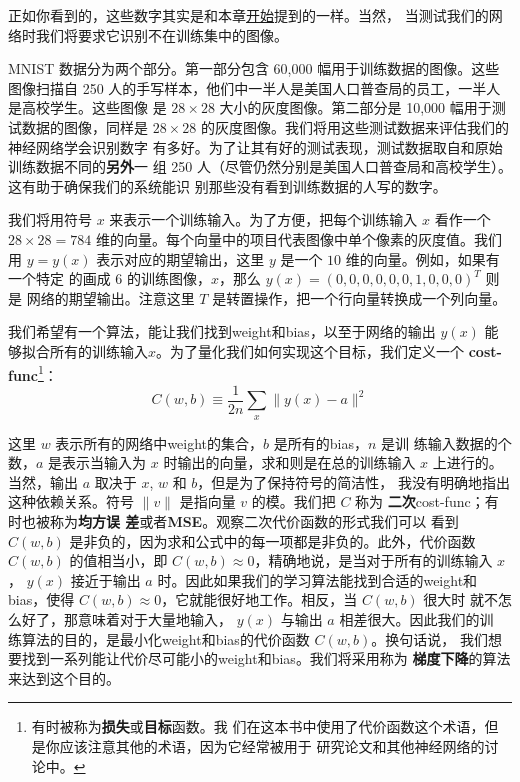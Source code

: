 正如你看到的，这些数字其实是和本章\hyperref[fig:digits]{开始}提到的一样。当然，
当测试我们的网络时我们将要求它识别不在训练集中的图像。

MNIST 数据分为两个部分。第一部分包含 60,000 幅用于训练数据的图像。这些图像扫描自
250 人的手写样本，他们中一半人是美国人口普查局的员工，一半人是高校学生。这些图像
是 $28 \times 28$ 大小的灰度图像。第二部分是 10,000 幅用于测试数据的图像，同样是
$28 \times 28$ 的灰度图像。我们将用这些测试数据来评估我们的神经网络学会识别数字
有多好。为了让其有好的测试表现，测试数据取自和原始训练数据不同的\textbf{另外}一
组 250 人（尽管仍然分别是美国人口普查局和高校学生）。这有助于确保我们的系统能识
别那些没有看到训练数据的人写的数字。

我们将用符号 $x$ 来表示一个训练输入。为了方便，把每个训练输入 $x$ 看作一个 $28
\times 28 = 784$ 维的向量。每个向量中的项目代表图像中单个像素的灰度值。我们用 $y
= y(x)$ 表示对应的期望输出，这里 $y$ 是一个 $10$ 维的向量。例如，如果有一个特定
的画成 $6$ 的训练图像，$x$，那么 $y(x) = (0, 0, 0, 0, 0, 0, 1, 0, 0, 0)^T$ 则是
网络的期望输出。注意这里 $T$ 是转置操作，把一个行向量转换成一个列向量。

我们希望有一个算法，能让我们找到\gls*{weight}和\gls*{bias}，以至于网络的输出
$y(x)$ 能够拟合所有的训练输入$x$。为了量化我们如何实现这个目标，我们定义一个%
\textbf{\gls{cost-func}}\footnote{有时被称为\textbf{损失}或\textbf{目标}函数。我
  们在这本书中使用了代价函数这个术语，但是你应该注意其他的术语，因为它经常被用于
  研究论文和其他神经网络的讨论中。}：
\begin{equation}
  C(w,b) \equiv \frac{1}{2n} \sum_x \| y(x) - a\|^2
  \label{eq:6}\tag{6}
\end{equation}

这里 $w$ 表示所有的网络中\gls*{weight}的集合，$b$ 是所有的\gls*{bias}，$n$ 是训
练输入数据的个数，$a$ 是表示当输入为 $x$ 时输出的向量，求和则是在总的训练输入
$x$ 上进行的。当然，输出 $a$ 取决于 $x$, $w$ 和 $b$，但是为了保持符号的简洁性，
我没有明确地指出这种依赖关系。符号 $\|v\|$ 是指向量 $v$ 的模。我们把 $C$ 称为%
\textbf{二次}\gls*{cost-func}；有时也被称为\textbf{均方误
  差}或者\textbf{MSE}。观察二次代价函数的形式我们可以
看到 $C(w,b)$ 是非负的，因为求和公式中的每一项都是非负的。此外，代价函数
$C(w,b)$ 的值相当小，即 $C(w,b) \approx 0$，精确地说，是当对于所有的训练输入 $x$，
$y(x)$ 接近于输出 $a$ 时。因此如果我们的学习算法能找到合适的\gls*{weight}和%
\gls*{bias}，使得 $C(w,b) \approx 0$，它就能很好地工作。相反，当 $C(w,b)$ 很大时
就不怎么好了，那意味着对于大量地输入， $y(x)$ 与输出 $a$ 相差很大。因此我们的训
练算法的目的，是最小化\gls*{weight}和\gls*{bias}的代价函数 $C(w,b)$。换句话说，
我们想要找到一系列能让代价尽可能小的\gls*{weight}和\gls*{bias}。我们将采用称为%
\textbf{梯度下降}的算法来达到这个目的。

